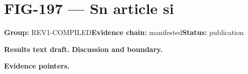 \clearpage
\section{FIG-197 --- Sn article si}
\label{figpage:fig-197}
\textbf{Group:} REV1-COMPILED\quad \textbf{Evidence chain:} manifested\quad \textbf{Status:} publication

\textbf{Results text draft.} 
\textbf{Discussion and boundary.} 


\textbf{Evidence pointers.}



\vfill
